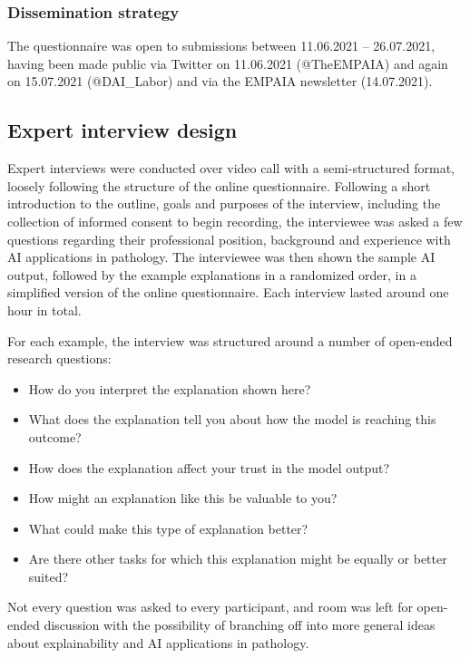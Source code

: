 \documentclass[final,5p,times,twocolumn,hyphens]{elsarticle}
\begin{document}
\subsubsection{Dissemination strategy}

The questionnaire was open to submissions between 11.06.2021 -- 26.07.2021, having been made public via Twitter on 11.06.2021 (@TheEMPAIA) and again on 15.07.2021 (@DAI\_Labor) and via the EMPAIA newsletter (14.07.2021).

\subsection{Expert interview design}
\label{sec:interviewdesign}
Expert interviews were conducted over video call with a semi-structured format, loosely following the structure of the online questionnaire. Following a short introduction to the outline, goals and purposes of the interview, including the collection of informed consent to begin recording, the interviewee was asked a few questions regarding their professional position, background and experience with AI applications in pathology. The interviewee was then shown the sample AI output, followed by the example explanations in a randomized order, in a simplified version of the online questionnaire. Each interview lasted around one hour in total.

For each example, the interview was structured around a number of open-ended research questions: 

\begin{itemize}
    \setlength\itemsep{1pt}
    \item How do you interpret the explanation shown here?
    \item What does the explanation tell you about how the model is reaching this outcome?
    \item How does the explanation affect your trust in the model output?
    \item How might an explanation like this be valuable to you?
    \item What could make this type of explanation better?
    \item Are there other tasks for which this explanation might be equally or better suited?
\end{itemize}

Not every question was asked to every participant, and room was left for open-ended discussion with the possibility of branching off into more general ideas about explainability and AI applications in pathology.
\end{document}
